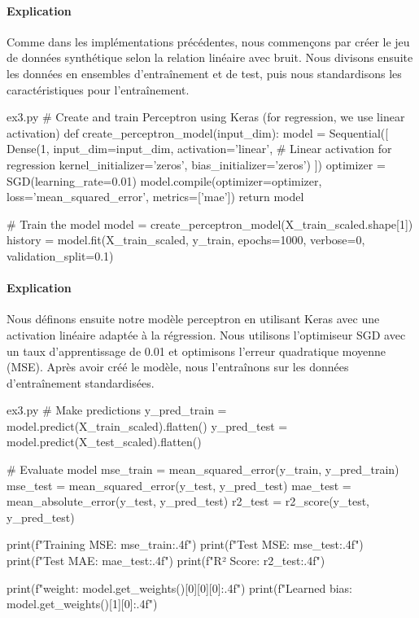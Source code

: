 \documentclass[12pt,a4paper]{article}
\begin{document}
\paragraph{Explication}
Comme dans les implémentations précédentes, nous commençons par créer le jeu de données synthétique selon la relation linéaire avec bruit.
Nous divisons ensuite les données en ensembles d'entraînement et de test, puis nous standardisons les caractéristiques pour l'entraînement.


\begin{codeholder}{ex3.py}
# Create and train Perceptron using Keras (for regression, we use linear activation)
def create_perceptron_model(input_dim):
    model = Sequential([
        Dense(1, input_dim=input_dim, activation='linear',  # Linear activation for regression
              kernel_initializer='zeros', bias_initializer='zeros')
    ])
    optimizer = SGD(learning_rate=0.01)
    model.compile(optimizer=optimizer, loss='mean_squared_error', metrics=['mae'])
    return model

# Train the model
model = create_perceptron_model(X_train_scaled.shape[1])
history = model.fit(X_train_scaled, y_train, 
                    epochs=1000, 
                    verbose=0,
                    validation_split=0.1)
\end{codeholder}

\paragraph{Explication}
Nous définons ensuite notre modèle perceptron en utilisant Keras avec une activation linéaire adaptée à la régression.
Nous utilisons l'optimiseur SGD avec un taux d'apprentissage de 0.01 et optimisons l'erreur quadratique moyenne (MSE).
Après avoir créé le modèle, nous l'entraînons sur les données d'entraînement standardisées.


\begin{codeholder}{ex3.py}
# Make predictions
y_pred_train = model.predict(X_train_scaled).flatten()
y_pred_test = model.predict(X_test_scaled).flatten()

# Evaluate model
mse_train = mean_squared_error(y_train, y_pred_train)
mse_test = mean_squared_error(y_test, y_pred_test)
mae_test = mean_absolute_error(y_test, y_pred_test)
r2_test = r2_score(y_test, y_pred_test)

print(f"Training MSE: {mse_train:.4f}")
print(f"Test MSE: {mse_test:.4f}")
print(f"Test MAE: {mae_test:.4f}")
print(f"R² Score: {r2_test:.4f}")

print(f"\nLearned weight: {model.get_weights()[0][0][0]:.4f}")
print(f"Learned bias: {model.get_weights()[1][0]:.4f}")
\end{codeholder}
\end{document}
